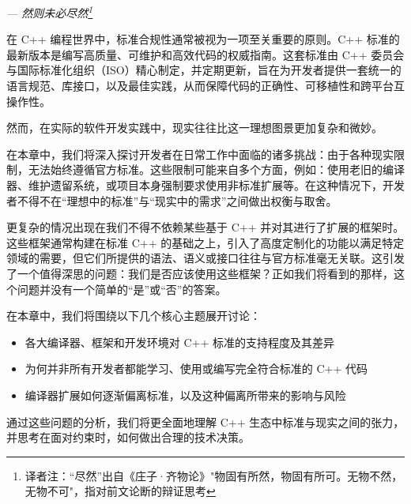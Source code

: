 
\begin{flushright}
\textit{--- 然则未必尽然\footnote{译者注：“尽然”出自《庄子·齐物论》"物固有所然，物固有所可。无物不然，无物不可"，指对前文论断的辩证思考}}
\end{flushright}

在 C++ 编程世界中，标准合规性通常被视为一项至关重要的原则。C++ 标准的最新版本是编写高质量、可维护和高效代码的权威指南。这套标准由 C++ 委员会与国际标准化组织（ISO）精心制定，并定期更新，旨在为开发者提供一套统一的语言规范、库接口，以及最佳实践，从而保障代码的正确性、可移植性和跨平台互操作性。

然而，在实际的软件开发实践中，现实往往比这一理想图景更加复杂和微妙。

在本章中，我们将深入探讨开发者在日常工作中面临的诸多挑战：由于各种现实限制，无法始终遵循官方标准。这些限制可能来自多个方面，例如：使用老旧的编译器、维护遗留系统，或项目本身强制要求使用非标准扩展等。在这种情况下，开发者不得不在“理想中的标准”与“现实中的需求”之间做出权衡与取舍。

更复杂的情况出现在我们不得不依赖某些基于 C++ 并对其进行了扩展的框架时。这些框架通常构建在标准 C++ 的基础之上，引入了高度定制化的功能以满足特定领域的需要，但它们所提供的语法、语义或接口往往与官方标准毫无关联。这引发了一个值得深思的问题：我们是否应该使用这些框架？正如我们将看到的那样，这个问题并没有一个简单的“是”或“否”的答案。

在本章中，我们将围绕以下几个核心主题展开讨论：

\begin{itemize}
\item 
各大编译器、框架和开发环境对 C++ 标准的支持程度及其差异

\item 
为何并非所有开发者都能学习、使用或编写完全符合标准的 C++ 代码

\item 
编译器扩展如何逐渐偏离标准，以及这种偏离所带来的影响与风险
\end{itemize}

通过这些问题的分析，我们将更全面地理解 C++ 生态中标准与现实之间的张力，并思考在面对约束时，如何做出合理的技术决策。